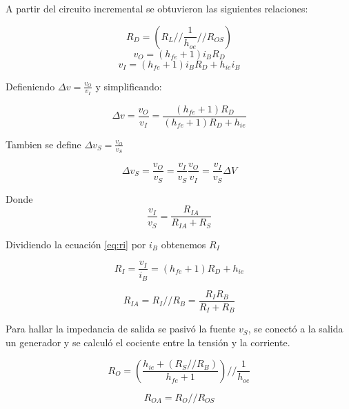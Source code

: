\documentclass[../../main.tex]{subfiles}
\begin{document}
A partir del circuito incremental se obtuvieron las siguientes relaciones:

\begin{equation}
R_D=\left( R_{L} // \frac{1}{h_{oe}} // R_{OS} \right)
\end{equation}
\begin{equation}
v_{O}=\left( h_{fe} +1 \right) i_{B} R_D
\end{equation}
\begin{equation}
v_{I}=\left( h_{fe} +1 \right) i_{B} R_D + h_{ie} i_{B} \label{eq:ri}
\end{equation}



Defieniendo $\Delta v =\frac{v_O}{v_I}$ y simplificando:

\begin{equation}
\Delta v =\frac{v_O}{v_I}=\frac{\left( h_{fe} +1 \right) R_D}{\left( h_{fe} +1 \right) R_D + h_{ie} }
\end{equation}

Tambien se define  $\Delta v_S =\frac{v_O}{v_S}$

\begin{equation}
\Delta v_S =\frac{v_O}{v_S}=\frac{v_I}{v_S} \frac{v_O}{v_I} =\frac{v_I}{v_S}\Delta V 
\end{equation}

Donde
\begin{equation}
\frac{v_I}{v_S} = \frac{R_{IA}}{R_{IA}+R_S}
\end{equation}

Dividiendo la ecuación \ref{eq:ri} por $i_B$ obtenemos $R_I$

\begin{equation}
R_I=\frac{v_I}{i_B} = \left( h_{fe} +1 \right) R_D + h_{ie}
\end{equation}

\begin{equation}
R_{IA}= R_I // R_B=\frac{R_I R_B}{R_I + R_B}
\end{equation}

Para hallar la impedancia de salida se pasiv\'o la fuente $v_S$, se conectó a la salida un generador y se calculó el cociente entre la tensión y la corriente.

\begin{equation}
R_O=\left( \frac{h_{ie} + \left( R_S // R_B \right)}{h_{fe}+1} \right) // \frac{1}{h_{oe}}
\end{equation}

\begin{equation}
R_{OA}=R_O // R_{OS}
\end{equation}
\end{document}
